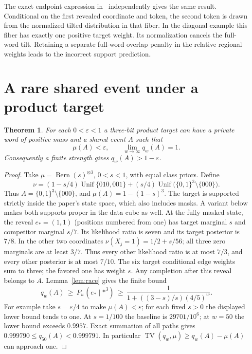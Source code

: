 \documentclass[11pt]{article}
\newtheorem{theorem}{Theorem}
\newcommand{\TV}{\operatorname{TV}}
\newcommand{\bern}{\operatorname{Bern}}
\newcommand{\unif}{\operatorname{Unif}}
\newcommand{\mask}{\mathord{*}}
\begin{document}
The exact endpoint expression in~\cite[Eqs.~(12), (15)]{he} independently gives the same result. Conditional on the first revealed coordinate and token, the second token is drawn from the normalized tilted distribution in that fiber. In the diagonal example this fiber has exactly one positive target weight. Its normalization cancels the full-word tilt. Retaining a separate full-word overlap penalty in the relative regional weights leads to the incorrect support prediction.

\section{A rare shared event under a product target}
\begin{theorem}\label{thm:rare}
For each \(0<\varepsilon<1\) a three-bit product target can have a private word of positive mass and a shared event \(A\) such that
\[ \mu(A)<\varepsilon,\qquad \lim_{w\to\infty}q_w(A)=1. \]
Consequently a finite strength gives \(q_w(A)>1-\varepsilon\).
\end{theorem}
\begin{proof}
Take \(\mu=\bern(s)^{\otimes3}\), \(0<s<1\), with equal class priors. Define
\[
 \nu=(1-s/4)\unif\{010,001\}+(s/4)\unif\bigl(\{0,1\}^3\setminus\{000\}\bigr).
\]
Thus \(A=\{0,1\}^3\setminus\{000\}\), and \(\mu(A)=1-(1-s)^3\). The target is supported strictly inside the paper's state space, which also includes masks. A variant below makes both supports proper in the data cube as well. At the fully masked state, the reveal \(e_*=(1,1)\) (positions numbered from one) has target marginal \(s\) and competitor marginal \(s/7\). Its likelihood ratio is seven and its target posterior is \(7/8\). In the other two coordinates \(\nu(X_j=1)=1/2+s/56\); all three zero marginals are at least \(3/7\). Thus every other likelihood ratio is at most \(7/3\), and every other posterior is at most \(7/10\). The six target conditional edge weights sum to three; the favored one has weight \(s\). Any completion after this reveal belongs to \(A\). Lemma~\ref{lem:race} gives the finite bound
\[
 q_w(A)\ \ge\ P_w(e_*\mid\mask^3)\ \ge\
       \frac{1}{1+((3-s)/s)(4/5)^w}.
\]
For example take \(s=\varepsilon/4\) to make \(\mu(A)<\varepsilon\); for each fixed \(s>0\) the displayed lower bound tends to one. At \(s=1/100\) the baseline is \(29701/10^6\); at \(w=50\) the lower bound exceeds \(0.9957\). Exact summation of all paths gives \(0.999790\le q_{50}(A)<0.999791\). In particular \(\TV(q_w,\mu)\ge q_w(A)-\mu(A)\) can approach one.
\end{proof}
\end{document}
